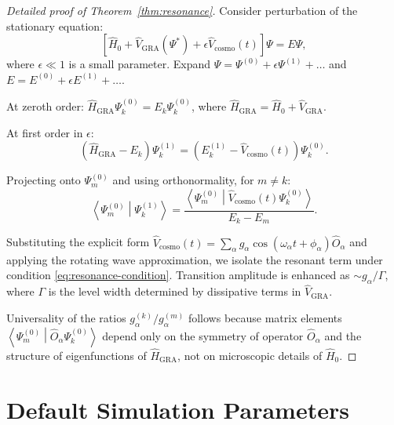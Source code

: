 \documentclass[12pt,a4paper]{article}
\theoremstyle{plain}
\theoremstyle{definition}
\theoremstyle{remark}
\newcommand{\GRA}{\text{GRA}}
\newcommand{\cosmo}{\text{cosmo}}
\newcommand{\inner}[2]{\left\langle #1 \middle| #2 \right\rangle}
\begin{document}
\begin{proof}[Detailed proof of Theorem~\ref{thm:resonance}]
Consider perturbation of the stationary equation:
\begin{equation}
\left[ \hat{H}_0 + \hat{V}_{\GRA}(\Psi^*) + \epsilon \hat{V}_{\cosmo}(t) \right] \Psi = E \Psi,
\end{equation}
where $\epsilon \ll 1$ is a small parameter. Expand $\Psi = \Psi^{(0)} + \epsilon \Psi^{(1)} + \dots$ and $E = E^{(0)} + \epsilon E^{(1)} + \dots$.

At zeroth order: $\hat{H}_{\GRA} \Psi_k^{(0)} = E_k \Psi_k^{(0)}$, where $\hat{H}_{\GRA} = \hat{H}_0 + \hat{V}_{\GRA}$.

At first order in $\epsilon$:
\begin{equation}
\left( \hat{H}_{\GRA} - E_k \right) \Psi_k^{(1)} = 
\left( E_k^{(1)} - \hat{V}_{\cosmo}(t) \right) \Psi_k^{(0)}.
\end{equation}

Projecting onto $\Psi_m^{(0)}$ and using orthonormality, for $m \neq k$:
\begin{equation}
\inner{\Psi_m^{(0)}}{\Psi_k^{(1)}} = 
\frac{\inner{\Psi_m^{(0)}}{\hat{V}_{\cosmo}(t) \Psi_k^{(0)}}}{E_k - E_m}.
\end{equation}

Substituting the explicit form $\hat{V}_{\cosmo}(t) = \sum_\alpha g_\alpha \cos(\omega_\alpha t + \phi_\alpha) \hat{O}_\alpha$ and applying the rotating wave approximation, we isolate the resonant term under condition \eqref{eq:resonance-condition}. Transition amplitude is enhanced as $\sim g_\alpha / \Gamma$, where $\Gamma$ is the level width determined by dissipative terms in $\hat{V}_{\GRA}$.

Universality of the ratios $g_\alpha^{(k)}/g_\alpha^{(m)}$ follows because matrix elements $\inner{\Psi_m^{(0)}}{\hat{O}_\alpha \Psi_k^{(0)}}$ depend only on the symmetry of operator $\hat{O}_\alpha$ and the structure of eigenfunctions of $\hat{H}_{\GRA}$, not on microscopic details of $\hat{H}_0$.
\end{proof}

\section{Default Simulation Parameters}
\label{app:params}
\end{document}
